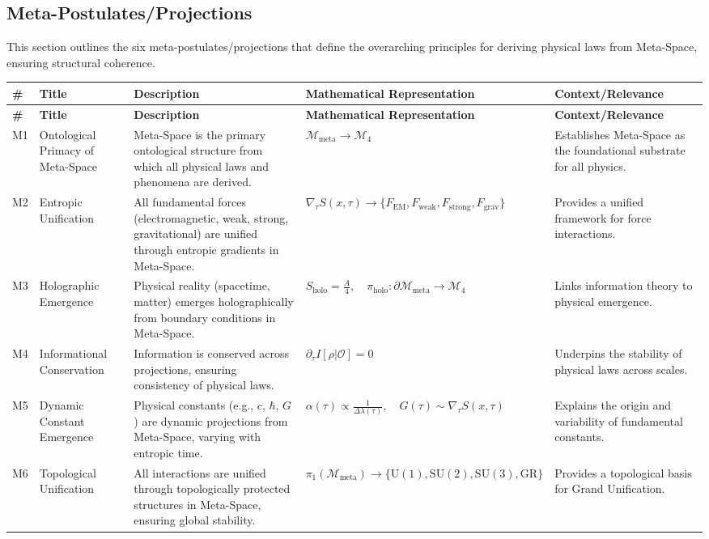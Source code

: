 \documentclass[10.5pt,a4paper]{article}
\begin{document}
\subsection{Meta-Postulates/Projections}
This section outlines the six meta-postulates/projections that define the overarching principles for deriving physical laws from Meta-Space, ensuring structural coherence.
{\small
\begin{longtable}{p{1cm} p{3.5cm} p{5.5cm} p{3.5cm} p{3.5cm}}
\hline
\textbf{\#} & \textbf{Title} & \textbf{Description} & \textbf{Mathematical Representation} & \textbf{Context/Relevance} \\
\hline
\endfirsthead
\hline
\textbf{\#} & \textbf{Title} & \textbf{Description} & \textbf{Mathematical Representation} & \textbf{Context/Relevance} \\
\hline
\endhead

M1 & Ontological Primacy of Meta-Space & Meta-Space is the primary ontological structure from which all physical laws and phenomena are derived. & \( \mathcal{M}_{\mathrm{meta}} \rightarrow \mathcal{M}_4 \) & Establishes Meta-Space as the foundational substrate for all physics. \\

M2 & Entropic Unification & All fundamental forces (electromagnetic, weak, strong, gravitational) are unified through entropic gradients in Meta-Space. & \( \nabla_\tau S(x, \tau) \rightarrow \{ F_{\mathrm{EM}}, F_{\mathrm{weak}}, F_{\mathrm{strong}}, F_{\mathrm{grav}} \} \) & Provides a unified framework for force interactions. \\

M3 & Holographic Emergence & Physical reality (spacetime, matter) emerges holographically from boundary conditions in Meta-Space. & \( S_{\mathrm{holo}} = \frac{A}{4}, \quad \pi_{\mathrm{holo}}: \partial \mathcal{M}_{\mathrm{meta}} \rightarrow \mathcal{M}_4 \) & Links information theory to physical emergence. \\

M4 & Informational Conservation & Information is conserved across projections, ensuring consistency of physical laws. & \( \partial_\tau I[\rho | \mathcal{O}] = 0 \) & Underpins the stability of physical laws across scales. \\

M5 & Dynamic Constant Emergence & Physical constants (e.g., \( c \), \( \hbar \), \( G \)) are dynamic projections from Meta-Space, varying with entropic time. & \( \alpha(\tau) \propto \frac{1}{\Delta \lambda(\tau)}, \quad G(\tau) \sim \nabla_\tau S(x, \tau) \) & Explains the origin and variability of fundamental constants. \\

M6 & Topological Unification & All interactions are unified through topologically protected structures in Meta-Space, ensuring global stability. & \( \pi_1(\mathcal{M}_{\mathrm{meta}}) \rightarrow \{ \mathrm{U}(1), \mathrm{SU}(2), \mathrm{SU}(3), \mathrm{GR} \} \) & Provides a topological basis for Grand Unification. \\
\hline
\end{longtable}
}
\end{document}
